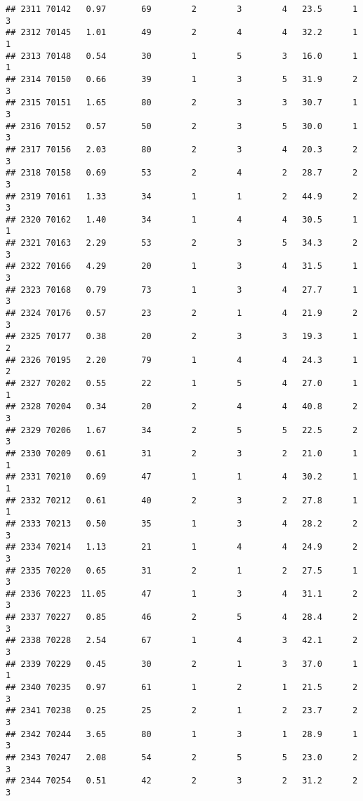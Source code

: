 \documentclass[
]{article}
\begin{document}
\begin{verbatim}
## 2311 70142   0.97       69        2        3        4   23.5      1      3
## 2312 70145   1.01       49        2        4        4   32.2      1      1
## 2313 70148   0.54       30        1        5        3   16.0      1      1
## 2314 70150   0.66       39        1        3        5   31.9      2      3
## 2315 70151   1.65       80        2        3        3   30.7      1      3
## 2316 70152   0.57       50        2        3        5   30.0      1      3
## 2317 70156   2.03       80        2        3        4   20.3      2      3
## 2318 70158   0.69       53        2        4        2   28.7      2      3
## 2319 70161   1.33       34        1        1        2   44.9      2      3
## 2320 70162   1.40       34        1        4        4   30.5      1      1
## 2321 70163   2.29       53        2        3        5   34.3      2      3
## 2322 70166   4.29       20        1        3        4   31.5      1      3
## 2323 70168   0.79       73        1        3        4   27.7      1      3
## 2324 70176   0.57       23        2        1        4   21.9      2      3
## 2325 70177   0.38       20        2        3        3   19.3      1      2
## 2326 70195   2.20       79        1        4        4   24.3      1      2
## 2327 70202   0.55       22        1        5        4   27.0      1      1
## 2328 70204   0.34       20        2        4        4   40.8      2      3
## 2329 70206   1.67       34        2        5        5   22.5      2      3
## 2330 70209   0.61       31        2        3        2   21.0      1      1
## 2331 70210   0.69       47        1        1        4   30.2      1      1
## 2332 70212   0.61       40        2        3        2   27.8      1      1
## 2333 70213   0.50       35        1        3        4   28.2      2      3
## 2334 70214   1.13       21        1        4        4   24.9      2      3
## 2335 70220   0.65       31        2        1        2   27.5      1      3
## 2336 70223  11.05       47        1        3        4   31.1      2      3
## 2337 70227   0.85       46        2        5        4   28.4      2      3
## 2338 70228   2.54       67        1        4        3   42.1      2      3
## 2339 70229   0.45       30        2        1        3   37.0      1      1
## 2340 70235   0.97       61        1        2        1   21.5      2      3
## 2341 70238   0.25       25        2        1        2   23.7      2      3
## 2342 70244   3.65       80        1        3        1   28.9      1      3
## 2343 70247   2.08       54        2        5        5   23.0      2      3
## 2344 70254   0.51       42        2        3        2   31.2      2      3

\end{verbatim}
\end{document}
